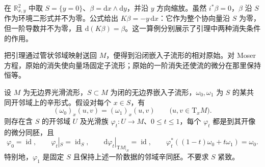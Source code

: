 \begin{example}\label{g4:exm:0803:relative-vanishing}
	在 \(\mathbb R^2_{x,y}\) 中取 \(S=\{y=0\}\)、\(\beta=\mathrm{d}x\wedge\mathrm{d}y\)，并沿 \(y\) 方向缩放。虽然 \(i^*\beta=0\)，\(\beta\) 沿 \(S\) 作为环境二形式并不为零。公式给出 \(K\beta=-y\,\mathrm{d}x\)：它作为整个协向量沿 \(S\) 为零，但一阶导数并不为零，且 \(\mathrm{d}(K\beta)=\beta\)。这一算例分别展示了引理中两种消失条件的作用。
\end{example}

把引理通过管状邻域映射送回 \(M\)，便得到沿闭嵌入子流形的相对原始。对 Moser 方程，原始的消失使向量场固定子流形；原始的一阶消失还使流的微分在那里保持恒等。

\begin{theorem}[相对 Moser 定理]\label{g4:thm:0803:relative-moser}
	设 \(M\) 为无边界光滑流形，\(S\subset M\) 为闭的无边界嵌入子流形，\(\omega_0,\omega_1\) 为 \(S\) 的某共同开邻域上的辛形式。假设对每个 \(x\in S\)，有
	\begin{equation}\label{g4:eq:0803:ambient-agreement}
		(\omega_0)_x(u,v)=(\omega_1)_x(u,v)
		\qquad\bigl(u,v\in\mathrm{T}_xM\bigr).
	\end{equation}
	则存在含 \(S\) 的开邻域 \(U\) 及光滑族 \(\varphi_t:U\to M\)、\(0\le t\le1\)，每个 \(\varphi_t\) 都是到其开像的微分同胚，且
	\[
		\varphi_0=\operatorname{id},\qquad
		\varphi_t|_S=\operatorname{id}_S,\qquad
		\mathrm{d}\varphi_t|_{\mathrm{T}M|_S}=\operatorname{id},\qquad
		\varphi_t^*((1-t)\omega_0+t\omega_1)=\omega_0.
	\]
	特别地，\(\varphi_1\) 是固定 \(S\) 且保持上述一阶数据的邻域辛同胚。不要求 \(S\) 紧致。
\end{theorem}
